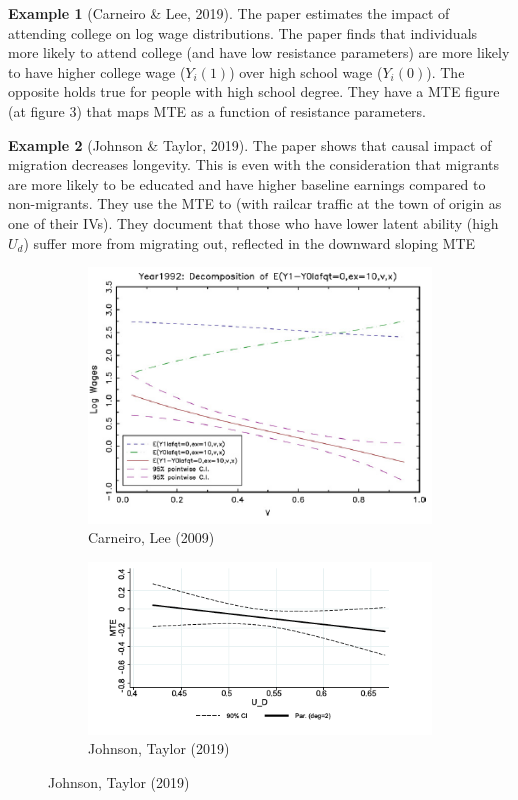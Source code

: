 \documentclass[12pt]{article}
\theoremstyle{definition}
\theoremstyle{property}
\theoremstyle{assumption}
\theoremstyle{example}
\newtheorem{example}{Example}[section]
\theoremstyle{comment}
\begin{document}
\begin{mdframed}[backgroundcolor=yellow!5] 
\begin{example}[Carneiro \& Lee, 2019] The paper estimates the impact of attending college on log wage distributions. The paper finds that individuals more likely to attend college (and have low resistance parameters) are more likely to have higher college wage ($Y_i(1)$) over high school wage ($Y_i(0)$). The opposite holds true for people with high school degree. They have a MTE figure (at figure 3) that maps MTE as a function of resistance parameters.
\end{example}
\begin{example}[Johnson \& Taylor, 2019] The paper shows that causal impact of migration decreases longevity. This is even with the consideration that migrants are more likely to be educated and have higher baseline earnings compared to non-migrants. They use the MTE to (with railcar traffic at the town of origin as one of their IVs). They document that those who have lower latent ability (high $U_d$) suffer more from migrating out, reflected in the downward sloping MTE 
\end{example}
\centering
\begin{figure}[H]
\begin{subfigure}{0.5\textwidth}
\includegraphics[width=\textwidth]{fig11_1}
\caption{Carneiro, Lee (2009)}
\end{subfigure}
\begin{subfigure}{0.5\textwidth}
\includegraphics[width=\textwidth]{fig11_2}
\caption{Johnson, Taylor (2019)}
\end{subfigure}
\end{figure}
\end{mdframed}
\end{document}
